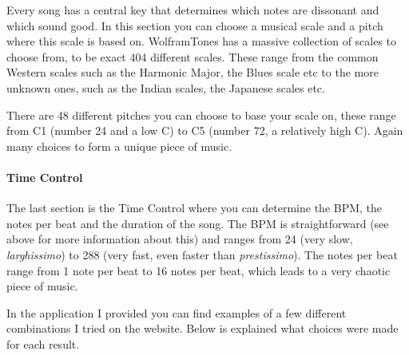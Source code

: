 \documentclass[12pt]{article}
\begin{document}
Every song has a central key that determines which notes are dissonant and which sound good. In this section you can choose a musical scale and a pitch where this scale is based on. WolframTones has a massive collection of scales to choose from, to be exact 404 different scales. These range from the common Western scales such as the Harmonic Major, the Blues scale etc to the more unknown ones, such as the Indian scales, the Japanese scales etc.

There are 48 different pitches you can choose to base your scale on, these range from C1 (number 24 and  a low C) to C5 (number 72, a relatively high C). Again many choices to form a unique piece of music.

\paragraph{Time Control}

The last section is the Time Control where you can determine the BPM, the notes per beat and the duration of the song. The BPM is straightforward (see above for more information about this) and ranges from 24 (very slow, \textit{larghissimo}) to 288 (very fast, even faster than \textit{prestissimo}).
The notes per beat range from 1 note per beat to 16 notes per beat, which leads to a very chaotic piece of music.
\newline

In the application I provided you can find examples of a few different combinations I tried on the website. Below is explained what choices were made for each result.
\end{document}
